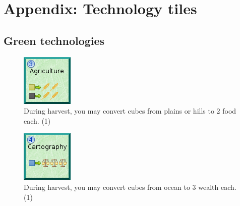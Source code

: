 \documentclass[11pt,a4paper,titlepage]{article}
\begin{document}
\section{Appendix: Technology tiles}{
  \subsection{Green technologies}{

  \begin{figure}[!htb]
    \begin{minipage}[c]{0.1\textwidth}
      \includegraphics[scale=.7]{doe_tech_agriculture.png}
    \end{minipage}\hfill
    \begin{minipage}[c]{0.6\textwidth}
      \captionsetup{labelformat=empty, justification=justified, singlelinecheck=false}
      \caption{During harvest, you may convert cubes from plains or hills to 2 food each. (1)}
    \end{minipage}\hfill
    \label{fig:tech_agriculture}
  \end{figure}

  \begin{figure}[!htb]
    \begin{minipage}[c]{0.1\textwidth}
      \includegraphics[scale=.7]{doe_tech_cartography.png}
    \end{minipage}\hfill
    \begin{minipage}[c]{0.6\textwidth}
      \captionsetup{labelformat=empty, justification=justified, singlelinecheck=false}
      \caption{During harvest, you may convert cubes from ocean to 3 wealth each. (1)}
    \end{minipage}\hfill
    \label{fig:tech_cartography}
  \end{figure}

}}
\end{document}
